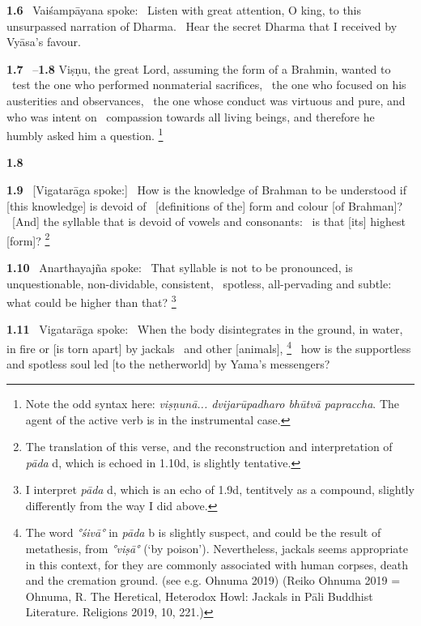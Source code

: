 \documentclass{article}
\newcommand{\skt}[1]{\textit{#1}}
\begin{document}
\textbf{1.6}%
\ Vaiśampāyana spoke:%
\ Listen with great attention, O king, to this unsurpassed narration of Dharma.%
\ Hear the secret Dharma that I received by Vyāsa's favour.%


\textbf{1.7}%
\ --\textbf{1.8} Viṣṇu, the great Lord, assuming the form of a Brahmin, wanted to%
\                  test the one who performed nonmaterial sacrifices,%
\                  the one who focused on his austerities and observances,%
\                  the one whose conduct was virtuous and pure, and who was intent on%
\                  compassion towards all living beings, and therefore he humbly asked him a question.%
\footnote{Note the odd syntax here: \skt{viṣṇunā... dvijarūpadharo bhūtvā papraccha}.               The agent of the active verb is in the instrumental case. }%


\textbf{1.8}%


\textbf{1.9}%
\ [Vigatarāga spoke:]%
\ How is the knowledge of Brahman to be understood if [this knowledge] is devoid of%
\                 [definitions of the] form and colour [of Brahman]?%
\ [And] the syllable that is devoid of vowels and consonants:%
\                                 is that [its] highest [form]?%
\footnote{The translation of this verse, and the reconstruction and interpretation                        of \skt{pāda} d, which is echoed in 1.10d, is slightly tentative. }%


\textbf{1.10}%
\ Anarthayajña spoke:%
\ That syllable is not to be pronounced, is unquestionable, non-dividable, consistent,%
\ spotless, all-pervading and subtle: what could be higher than that?%
\footnote{I interpret \skt{pāda} d, which is an echo of 1.9d, tentitvely as a compound,                slightly differently from the way I did above. }%


\textbf{1.11}%
\ Vigatarāga spoke:%
\ When the body disintegrates in the ground, in water, in fire or [is torn apart] by jackals%
\                         and other [animals],%
\footnote{The word \skt{°śivā°} in \skt{pāda} b is slightly suspect, and could be the result                of metathesis, from \skt{°viṣā°} (`by poison'). Nevertheless,                 jackals seems appropriate in this context, for they                 are commonly associated with human corpses, death and the cremation ground.                (see e.g. Ohnuma 2019)                 (Reiko Ohnuma 2019 = Ohnuma, R. The Heretical, Heterodox Howl:                         Jackals in Pāli Buddhist Literature. Religions 2019, 10, 221.) }%
\ how is the supportless and spotless soul led [to the netherworld] by Yama's messengers?%
\end{document}
